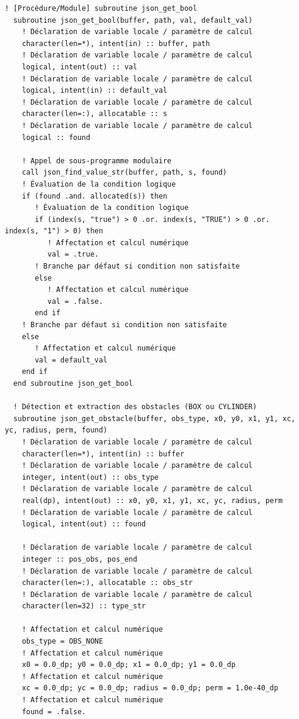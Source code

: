 \documentclass[10pt,a4paper,oneside]{book}
\begin{document}
\begin{lstlisting}[language={[95]Fortran}]
  ! [Procédure/Module] subroutine json_get_bool
  subroutine json_get_bool(buffer, path, val, default_val)
    ! Déclaration de variable locale / paramètre de calcul
    character(len=*), intent(in) :: buffer, path
    ! Déclaration de variable locale / paramètre de calcul
    logical, intent(out) :: val
    ! Déclaration de variable locale / paramètre de calcul
    logical, intent(in) :: default_val
    ! Déclaration de variable locale / paramètre de calcul
    character(len=:), allocatable :: s
    ! Déclaration de variable locale / paramètre de calcul
    logical :: found

    ! Appel de sous-programme modulaire
    call json_find_value_str(buffer, path, s, found)
    ! Évaluation de la condition logique
    if (found .and. allocated(s)) then
       ! Évaluation de la condition logique
       if (index(s, "true") > 0 .or. index(s, "TRUE") > 0 .or. index(s, "1") > 0) then
          ! Affectation et calcul numérique
          val = .true.
       ! Branche par défaut si condition non satisfaite
       else
          ! Affectation et calcul numérique
          val = .false.
       end if
    ! Branche par défaut si condition non satisfaite
    else
       ! Affectation et calcul numérique
       val = default_val
    end if
  end subroutine json_get_bool

  ! Détection et extraction des obstacles (BOX ou CYLINDER)
  subroutine json_get_obstacle(buffer, obs_type, x0, y0, x1, y1, xc, yc, radius, perm, found)
    ! Déclaration de variable locale / paramètre de calcul
    character(len=*), intent(in) :: buffer
    ! Déclaration de variable locale / paramètre de calcul
    integer, intent(out) :: obs_type
    ! Déclaration de variable locale / paramètre de calcul
    real(dp), intent(out) :: x0, y0, x1, y1, xc, yc, radius, perm
    ! Déclaration de variable locale / paramètre de calcul
    logical, intent(out) :: found

    ! Déclaration de variable locale / paramètre de calcul
    integer :: pos_obs, pos_end
    ! Déclaration de variable locale / paramètre de calcul
    character(len=:), allocatable :: obs_str
    ! Déclaration de variable locale / paramètre de calcul
    character(len=32) :: type_str

    ! Affectation et calcul numérique
    obs_type = OBS_NONE
    ! Affectation et calcul numérique
    x0 = 0.0_dp; y0 = 0.0_dp; x1 = 0.0_dp; y1 = 0.0_dp
    ! Affectation et calcul numérique
    xc = 0.0_dp; yc = 0.0_dp; radius = 0.0_dp; perm = 1.0e-40_dp
    ! Affectation et calcul numérique
    found = .false.


\end{lstlisting}
\end{document}
